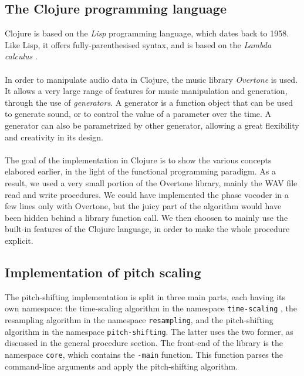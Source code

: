 \documentclass[letterpaper]{article}
\newcommand*{\codeinl}{\texttt}
\theoremstyle{definition}
\theoremstyle{remark}
\theoremstyle{plain}
\begin{document}
\subsection{The Clojure programming language}
Clojure is based on the \emph{Lisp} programming language, which dates back to
1958. Like Lisp, it offers fully-parenthesised syntax, and is based on the
\emph{Lambda calculus} \citep{Rojas_atutorial}.

\paragraph{}
In order to manipulate audio data in Clojure, the music library \emph{Overtone}
is used. It allows a very large range of features for music manipulation and
generation, through the use of \emph{generators}. A generator is a function
object that can be used to generate sound, or to control the value of a
parameter over the time. A generator can also be parametrized by other
generator, allowing a great flexibility and creativity in its design.

\paragraph{}
The goal of the implementation in Clojure is to show the various concepts
elabored earlier, in the light of the functional programming paradigm. As a
result, we used a very small portion of the Overtone library, mainly the WAV
file read and write procedures. We could have implemented the phase vocoder in a
few lines only with Overtone, but the juicy part of the algorithm would have
been hidden behind a library function call. We then choosen to mainly use the
built-in features of the Clojure language, in order to make the whole procedure
explicit.

\subsection{Implementation of pitch scaling}
The pitch-shifting implementation is split in three main parts, each having its
own namespace: the time-scaling algorithm in the namespace
\codeinl{time-scaling} , the resampling algorithm in the namespace
\codeinl{resampling}, and the pitch-shifting algorithm in the namespace
\codeinl{pitch-shifting}. The latter uses the two former, as discussed in the
general procedure section. The front-end of the library is the namespace
\codeinl{core}, which contains the \codeinl{-main} function. This function
parses the command-line arguments and apply the pitch-shifting algorithm.
\end{document}
